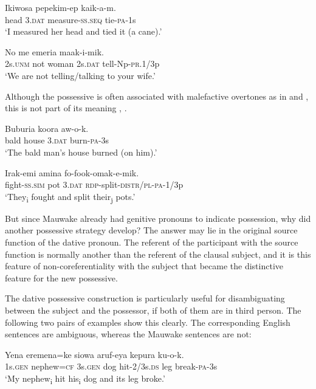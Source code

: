 \ea%
\label{ex:3:x1790}
\gll Ikiwosa  pepekim-ep kaik-a-m. \\
head 3.\textsc{dat} measure-\textsc{ss}.\textsc{seq} tie-\textsc{pa}-1s\\
\glt`I measured her head and tied it (a cane).'
\z

\ea%
\label{ex:3:x1795}
\gll No me emeria  maak-i-mik. \\
2s.\textsc{unm} not woman 2s.\textsc{dat} tell-Np-\textsc{pr}.1/3p\\
\glt`We are not telling/talking to your wife.'
\z

Although the possessive is often associated with malefactive overtones as in  and , this is not part of its meaning , . 

\ea%
\label{ex:3:x1787}
\gll Buburia koora  aw-o-k. \\
bald house 3.\textsc{dat} burn-\textsc{pa}-3s \\
\glt`The bald man's house burned (on him).'
\z

\ea%
\label{ex:3:x1792}
\gll Irak-emi amina  fo-fook-omak-e-mik. \\
fight-\textsc{ss}.\textsc{sim} pot 3.\textsc{dat} \textsc{rdp}-split-\textsc{distr}/\textsc{pl}-\textsc{pa}-1/3p\\
\glt`They\textsubscript{i} fought and split their\textsubscript{j} pots.'
\z

But since Mauwake already had genitive pronouns to indicate possession, why did another possessive strategy develop? The answer may lie in the original source function of the dative pronoun. The referent of the participant with the source function is normally another than the referent of the clausal subject, and it is this feature of non-coreferentiality with the subject that became the distinctive feature for the new possessive. 

The dative possessive construction is particularly useful for disambiguating between the subject and the possessor, if both of them are in third person. The following two pairs of examples show this clearly. The corresponding English sentences are ambiguous, whereas the Mauwake sentences are not: 

\ea%
\label{ex:3:x1797}
\gll Yena eremena=ke   siowa aruf-eya kepura ku-o-k. \\
1s.\textsc{gen} nephew=\textsc{cf} 3s.\textsc{gen} dog hit-2/3s.\textsc{ds} leg break-\textsc{pa}-3s\\
\glt`My nephew\textsubscript{i} hit his\textsubscript{i} dog and its leg broke.'
\z

